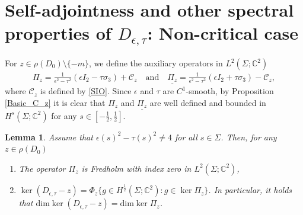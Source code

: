 \documentclass[11pt,a4paper,reqno,oneside]{amsproc}
\def \cc {{\mathbb C}}
\numberwithin{equation}{section}
\def \cc {{\mathbb{C}}}
\newtheorem{lemma}[definition]{Lemma}
\begin{document}
\section{Self-adjointness and other spectral properties of $D_{\epsilon,\tau}$: Non-critical case}\label{S4}
For $z\in\rho(D_0)\setminus\{-m\}$, we define the auxiliary operators   in $L^2(\Sigma;\mathbb C^2)$
\begin{align}\label{def_Pi}
    \Pi_z= \frac{1}{\epsilon^2-\tau^2}(\epsilon I_2-\tau\sigma_3)+ \mathscr{C}_z \quad\text{and}\quad \underline{ \Pi_z}= \frac{1}{\epsilon^2-\tau^2}(\epsilon I_2+\tau\sigma_3)- \mathscr{C}_z,
\end{align}
where $\mathscr{C}_z$ is defined by \eqref{SIO}. Since $\epsilon$ and $\tau$ are $C^1$-smooth, by Proposition \ref{Basic_C_z} it is clear that $\Pi_z$ and $\underline{ \Pi_z}$ are well defined and bounded in $H^s(\Sigma;\cc^2)$ for any $s\in[-\frac{1}{2},\frac{1}{2}]$. 
\begin{lemma}\label{Pi_Fredholm} Assume that $\epsilon(s)^2-\tau(s)^2\neq 4$ for all $s\in\Sigma$. Then, for any $z\in\rho(D_0)$ 
\begin{enumerate}
\item[(i)]  The operator $\Pi_z$ is Fredholm with index zero in $L^2(\Sigma;\cc^2)$,
\item[(ii)] $\ker (D_{\epsilon,\tau}-z)=\Phi_z\{ g\in H^{\frac{1}{2}}(\Sigma;\cc^2): g\in\ker \Pi_z\}$. In particular, it holds that $\mathrm{dim}\ker (D_{\epsilon,\tau}-z)=\mathrm{dim}\ker \Pi_z$.
\end{enumerate}
\end{lemma}
\end{document}
